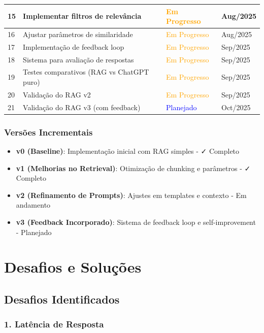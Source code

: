 \documentclass[12pt,a4paper]{report}
\begin{document}
\begin{longtable}{|p{2cm}|p{6cm}|p{2cm}|p{2cm}|}
\hline
15 & Implementar filtros de relevância & \textcolor{orange}{Em Progresso} & Aug/2025 \\
\hline
16 & Ajustar parâmetros de similaridade & \textcolor{orange}{Em Progresso} & Aug/2025 \\
\hline
17 & Implementação de feedback loop & \textcolor{orange}{Em Progresso} & Sep/2025 \\
\hline
18 & Sistema para avaliação de respostas & \textcolor{orange}{Em Progresso} & Sep/2025 \\
\hline
19 & Testes comparativos (RAG vs ChatGPT puro) & \textcolor{orange}{Em Progresso} & Sep/2025 \\
\hline
20 & Validação do RAG v2 & \textcolor{orange}{Em Progresso} & Sep/2025 \\
\hline
21 & Validação do RAG v3 (com feedback) & \textcolor{blue}{Planejado} & Oct/2025 \\
\hline
\end{longtable}

\subsection{Versões Incrementais}

\begin{itemize}
  \item \textbf{v0 (Baseline)}: Implementação inicial com RAG simples - ✓ Completo
  \item \textbf{v1 (Melhorias no Retrieval)}: Otimização de chunking e parâmetros - ✓ Completo
  \item \textbf{v2 (Refinamento de Prompts)}: Ajustes em templates e contexto - Em andamento
  \item \textbf{v3 (Feedback Incorporado)}: Sistema de feedback loop e self-improvement - Planejado
\end{itemize}

\newpage

\chapter{Desafios e Soluções}

\section{Desafios Identificados}

\subsection{1. Latência de Resposta}
\end{document}
